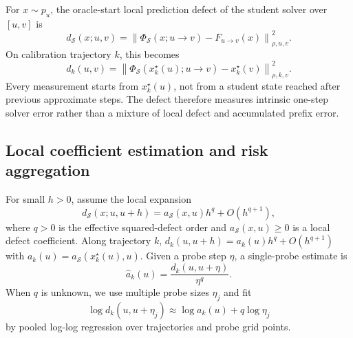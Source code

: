 For $x\sim p_u$, the oracle-start local prediction defect of the student solver
over $[u,v]$ is
\begin{equation}
  d_{\mathcal S}(x;u,v)
  =
  \left\|
  \Phi_{\mathcal S}(x;u\rightarrow v)-F_{u\rightarrow v}(x)
  \right\|_{\rho,u,v}^{2}.
  \label{eq:oracle-defect-distribution}
\end{equation}
On calibration trajectory $k$, this becomes
\begin{equation}
  d_k(u,v)
  =
  \left\|
  \Phi_{\mathcal S}(x_k^\star(u);u\rightarrow v)-x_k^\star(v)
  \right\|_{\rho,k,v}^{2}.
  \label{eq:oracle-defect-empirical}
\end{equation}
Every measurement starts from $x_k^\star(u)$, not from a student state reached
after previous approximate steps. The defect therefore measures intrinsic
one-step solver error rather than a mixture of local defect and accumulated
prefix error.

\subsection{Local coefficient estimation and risk aggregation}

For small $h>0$, assume the local expansion
\begin{equation}
  d_{\mathcal S}(x;u,u+h)
  =
  a_{\mathcal S}(x,u)h^q+O(h^{q+1}),
  \label{eq:local-power-law-method}
\end{equation}
where $q>0$ is the effective squared-defect order and
$a_{\mathcal S}(x,u)\ge0$ is a local defect coefficient. Along trajectory $k$,
$d_k(u,u+h)=a_k(u)h^q+O(h^{q+1})$ with
$a_k(u)=a_{\mathcal S}(x_k^\star(u),u)$. Given a probe step $\eta$, a
single-probe estimate is
\begin{equation}
  \widehat a_k(u)=\frac{d_k(u,u+\eta)}{\eta^q}.
\end{equation}
When $q$ is unknown, we use multiple probe sizes $\eta_j$ and fit
\begin{equation}
  \log d_k(u,u+\eta_j)\approx \log a_k(u)+q\log\eta_j
\end{equation}
by pooled log-log regression over trajectories and probe grid points.

